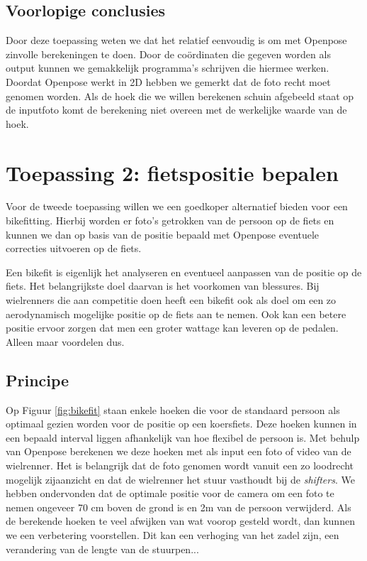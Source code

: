 \documentclass[a4paper,twoside,kulak]{kulakreport}
\begin{document}
\subsection{Voorlopige conclusies}
Door deze  toepassing weten we dat het relatief eenvoudig is om met Openpose zinvolle berekeningen te doen. Door de coördinaten die gegeven worden als output kunnen we gemakkelijk programma's schrijven die hiermee werken. Doordat Openpose werkt in 2D hebben we gemerkt dat de foto recht moet genomen worden. Als de hoek die we willen berekenen schuin afgebeeld staat op de inputfoto komt de berekening niet overeen met de werkelijke waarde van de hoek.


\section{Toepassing 2: fietspositie bepalen}
Voor de tweede toepassing willen we een goedkoper alternatief bieden voor een bikefitting. Hierbij worden er foto's getrokken van de persoon op de fiets en kunnen we dan op basis van de positie bepaald met Openpose eventuele correcties uitvoeren op de fiets.

Een bikefit is eigenlijk het analyseren en eventueel aanpassen van de positie op de fiets. Het belangrijkste doel daarvan is het voorkomen van blessures. Bij wielrenners die aan competitie doen heeft een bikefit ook als doel om een zo aerodynamisch mogelijke positie op de fiets aan te nemen. Ook kan een betere positie ervoor zorgen dat men een groter wattage kan leveren op de pedalen. Alleen maar voordelen dus.

\subsection{Principe}

Op Figuur \ref{fig:bikefit} staan enkele hoeken die voor de standaard persoon als optimaal gezien worden voor de positie op een koersfiets. Deze hoeken kunnen in een bepaald interval liggen afhankelijk van hoe flexibel de persoon is. Met behulp van Openpose berekenen we deze hoeken met als input een foto of video van de wielrenner. Het is belangrijk dat de foto genomen wordt vanuit een zo loodrecht mogelijk zijaanzicht en dat de wielrenner het stuur vasthoudt bij de \emph{shifters}. We hebben ondervonden dat de optimale positie voor de camera om een foto te nemen ongeveer 70 \si{cm} boven de grond is en 2\si{m} van de persoon verwijderd. Als de berekende hoeken te veel afwijken van wat voorop gesteld wordt, dan kunnen we een verbetering voorstellen. Dit kan een verhoging van het zadel zijn, een verandering van de lengte van de stuurpen... 
\end{document}
